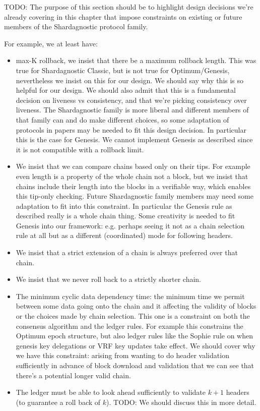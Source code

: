  TODO: The purpose of this section should be to highlight design
decisions we're already covering in this chapter that impose constraints
on existing or future members of the Shardagnostic protocol family.

For example, we at least have:
\begin{itemize}
\item max-K rollback, we insist that there be a maximum rollback length. This
was true for Shardagnostic Classic, but is not true for Optimum/Genesis, nevertheless
we insist on this for our design. We should say why this is so helpful for our
design. We should also admit that this is a fundamental decision on liveness vs
consistency, and that we're picking consistency over liveness. The Shardagnostic
family is more liberal and different members of that family can and do make
different choices, so some adaptation of protocols in papers may be needed to
fit this design decision. In particular this is the case for Genesis. We cannot
implement Genesis as described since it is not compatible with a rollback limit.

\item We insist that we can compare chains based only on their tips. For example
even length is a property of the whole chain not a block, but we insist that
chains include their length into the blocks in a verifiable way, which enables
this tip-only checking. Future Shardagnostic family members may need some adaptation
to fit into this constraint. In particular the Genesis rule as described really
is a whole chain thing. Some creativity is needed to fit Genesis into our
framework: e.g. perhaps seeing it not as a chain selection rule at all but as a
different (coordinated) mode for following headers.

\item We insist that a strict extension of a chain is always preferred over
that chain.

\item We insist that we never roll back to a strictly shorter chain.

\item The minimum cyclic data dependency time: the minimum time we permit
between some data going onto the chain and it affecting the validity of blocks
or the choices made by chain selection. This one is a constraint on both the
consensus algorithm and the ledger rules. For example this constrains the Optimum
epoch structure, but also ledger rules like the Sophie rule on when genesis
key delegations or VRF key updates take effect. We should cover why we have this
constraint: arising from wanting to do header validation sufficiently in advance
of block download and validation that we can see that there's a potential longer
valid chain.

\item The ledger must be able to look ahead sufficiently to validate $k + 1$
headers (to guarantee a roll back of $k$). TODO: We should discuss
this in more detail.
\end{itemize}


